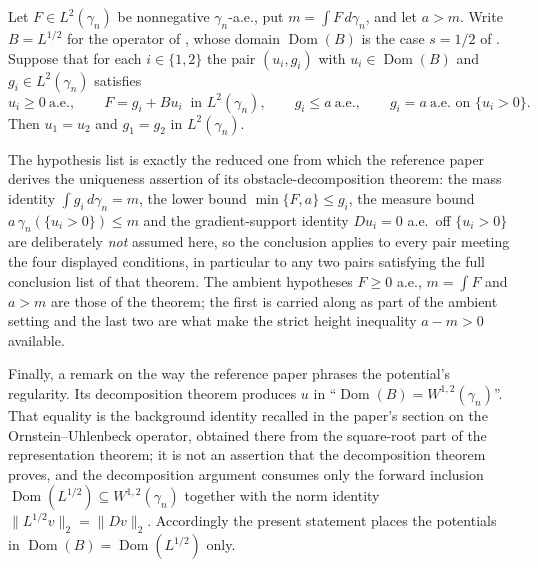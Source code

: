 \begin{theorem}
Let $F \in L^2(\gamma_n)$ be nonnegative $\gamma_n$-a.e., put
$m = \int F \, d\gamma_n$, and let $a > m$.  Write $B = L^{1/2}$ for the
operator of , whose domain $\operatorname{Dom}(B)$ is the case
$s = 1/2$ of .  Suppose that for each $i \in \{1,2\}$ the
pair $(u_i, g_i)$ with $u_i \in \operatorname{Dom}(B)$ and $g_i \in L^2(\gamma_n)$
satisfies
\[
  u_i \geq 0 \ \text{a.e.},
  \qquad
  F = g_i + B u_i \ \text{ in } L^2(\gamma_n),
  \qquad
  g_i \leq a \ \text{a.e.},
  \qquad
  g_i = a \ \text{a.e. on } \{u_i > 0\} .
\]
Then $u_1 = u_2$ and $g_1 = g_2$ in $L^2(\gamma_n)$.

The hypothesis list is exactly the reduced one from which the reference paper
derives the uniqueness assertion of its obstacle-decomposition theorem: the
mass identity $\int g_i \, d\gamma_n = m$, the lower bound
$\min\{F,a\} \leq g_i$, the measure bound $a\,\gamma_n(\{u_i>0\}) \leq m$ and the
gradient-support identity $Du_i = 0$ a.e.\ off $\{u_i > 0\}$ are deliberately
\emph{not} assumed here, so the conclusion applies to every pair meeting the
four displayed conditions, in particular to any two pairs satisfying the full
conclusion list of that theorem.  The ambient hypotheses $F \geq 0$ a.e.,
$m = \int F$ and $a > m$ are those of the theorem; the first is carried along as
part of the ambient setting and the last two are what make the strict height
inequality $a - m > 0$ available.

Finally, a remark on the way the reference paper phrases the potential's
regularity.  Its decomposition theorem produces $u$ in
``$\operatorname{Dom}(B) = W^{1,2}(\gamma_n)$''.  That equality is the background
identity recalled in the paper's section on the Ornstein--Uhlenbeck operator,
obtained there from the square-root part of the representation theorem; it is
not an assertion that the decomposition theorem proves, and the decomposition
argument consumes only the forward inclusion
$\operatorname{Dom}(L^{1/2}) \subseteq W^{1,2}(\gamma_n)$ together with the norm
identity $\|L^{1/2}v\|_2 = \|Dv\|_2$.  Accordingly the present statement places
the potentials in $\operatorname{Dom}(B) = \operatorname{Dom}(L^{1/2})$ only.
\end{theorem}
